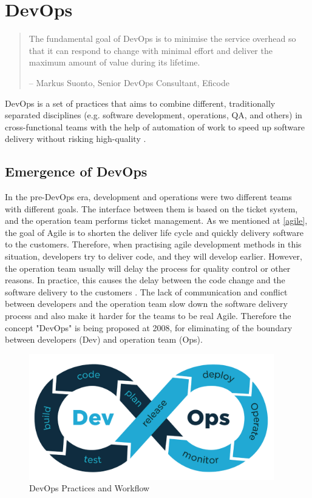 \section{DevOps}
\begin{quotation}
    The fundamental goal of DevOps is to minimise the service overhead so that it can respond to change with minimal effort and deliver the maximum amount of value during its lifetime.
    \begin{flushright}
        -- Markus Suonto, Senior DevOps Consultant, Eficode
    \end{flushright}
\end{quotation}
\label{devops}
DevOps is a set of practices that aims to combine different, traditionally separated disciplines (e.g. software development, operations, QA, and others) in cross-functional teams with the help of automation of work to speed up software delivery without risking high-quality \cite{bass2015devops}.
\subsection{Emergence of DevOps}
In the pre-DevOps era, development and operations were two different teams with different goals. The interface between them is based on the ticket system, and the operation team performs ticket management. As we mentioned at \ref{agile}, the goal of Agile is to shorten the deliver life cycle and quickly delivery software to the customers. Therefore, when practising agile development methods in this situation, developers try to deliver code, and they will develop earlier.
However, the operation team usually will delay the process for quality control or other reasons. In practice, this causes the delay between the code change and the software delivery to the customers \cite{leite2019survey}. The lack of communication and conflict between developers and the operation team slow down the software delivery process and also make it harder for the teams to be real Agile. Therefore the concept "DevOps" is being proposed at 2008, for eliminating of the boundary between developers (Dev) and operation team (Ops).
\begin{figure}[h]
    \centering
    \includegraphics[width=0.95\textwidth]{pics/DevOps.png}
    \caption{DevOps Practices and Workflow \cite{DevOpsin72:online}}
    \label{fig:DevOps}
\end{figure}
